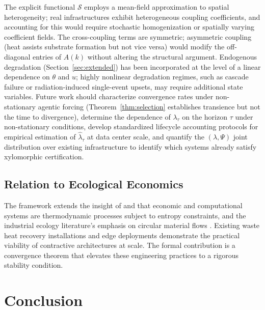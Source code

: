 \documentclass[10pt,twocolumn]{article}
\theoremstyle{plain}
\theoremstyle{definition}
\theoremstyle{remark}
\begin{document}
The explicit functional $\mathcal{S}$ employs a mean-field
approximation to spatial heterogeneity; real infrastructures exhibit
heterogeneous coupling coefficients, and accounting for this would
require stochastic homogenization or spatially varying coefficient
fields. The cross-coupling terms are symmetric; asymmetric coupling
(heat assists substrate formation but not vice versa) would modify
the off-diagonal entries of $A(k)$ without altering the structural
argument. Endogenous degradation (Section~\ref{sec:extended}) has
been incorporated at the level of a linear dependence on $\theta$
and $u$; highly nonlinear degradation regimes, such as cascade
failure or radiation-induced single-event upsets, may require
additional state variables. Future work should characterize
convergence rates under non-stationary agentic forcing
(Theorem~\ref{thm:selection} establishes transience but not the
time to divergence), determine the dependence of $\lambda_\tau$ on
the horizon $\tau$ under non-stationary conditions, develop
standardized lifecycle accounting protocols for empirical estimation
of $\hat\lambda_\tau$ at data center scale, and quantify the
$(\lambda, \Psi)$ joint distribution over existing infrastructure to
identify which systems already satisfy xylomorphic certification.

\subsection{Relation to Ecological Economics}

The framework extends the insight of \citet{georgescu1971} and
\citet{odum1994} that economic and computational systems are
thermodynamic processes subject to entropy constraints, and the
industrial ecology literature's emphasis on circular material flows
\citep{ayres1998}. Existing waste heat recovery installations
\citep{rambo2014,stockholm2020} and edge deployments
\citep{satyanarayanan2017} demonstrate the practical viability of
contractive architectures at scale. The formal contribution is a
convergence theorem that elevates these engineering practices to a
rigorous stability condition.

\section{Conclusion}
\end{document}
